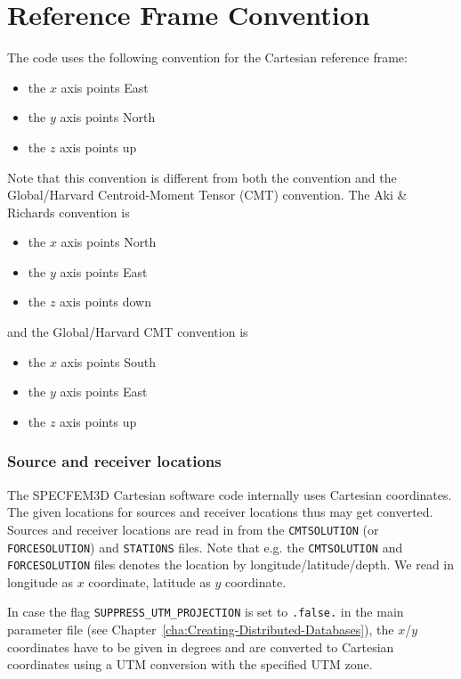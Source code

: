\chapter{Reference Frame Convention}\label{cha:Coordinates}

The code uses the following convention for the Cartesian reference
frame:
\begin{itemize}
\item the $x$ axis points East
\item the $y$ axis points North
\item the $z$ axis points up
\end{itemize}
Note that this convention is different from both the \citet{AkRi80}
convention and the Global/Harvard Centroid-Moment Tensor (CMT) convention.
The Aki \& Richards convention is
\begin{itemize}
\item the $x$ axis points North
\item the $y$ axis points East
\item the $z$ axis points down
\end{itemize}
and the Global/Harvard CMT convention is
\begin{itemize}
\item the $x$ axis points South
\item the $y$ axis points East
\item the $z$ axis points up
\end{itemize}

\subsection*{Source and receiver locations}

The SPECFEM3D Cartesian software code internally uses Cartesian coordinates.
The given locations for sources and receiver locations thus may get
converted. Sources and receiver locations are read in from the \texttt{CMTSOLUTION}
(or \texttt{FORCESOLUTION}) and \texttt{STATIONS} files. Note that
e.g. the \texttt{CMTSOLUTION} and \texttt{FORCESOLUTION} files denotes
the location by \textquotedbl{}longitude/latitude/depth\textquotedbl{}.
We read in longitude as $x$ coordinate, latitude as $y$ coordinate.\newline

In case the flag \texttt{SUPPRESS\_UTM\_PROJECTION} is set to \texttt{.false.}
in the main parameter file (see Chapter~\ref{cha:Creating-Distributed-Databases}),
the $x$/$y$ coordinates have to be given in degrees and are converted
to Cartesian coordinates using a UTM conversion with the specified
UTM zone.\newline

